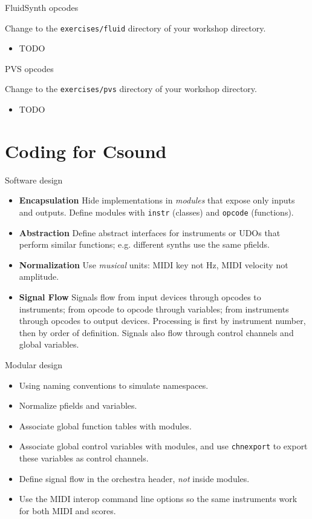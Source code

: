 \documentclass{beamer}
\begin{document}
\begin{frame}{FluidSynth opcodes}
\begin{example}
Change to the \texttt{exercises/fluid} directory of your workshop directory.
\begin{itemize}
\item TODO
\end{itemize}
\end{example}
\end{frame}

\begin{frame}{PVS opcodes}
\begin{example}
Change to the \texttt{exercises/pvs} directory of your workshop directory.
\begin{itemize}
\item TODO
\end{itemize}
\end{example}
\end{frame}


\section{Coding for Csound}
\begin{frame}{Software design}
\begin{itemize}
\item \textbf{Encapsulation} Hide implementations in \textit{modules} that
expose only inputs and outputs. Define modules with \texttt{instr} (classes) and
\texttt{opcode} (functions).
\item \textbf{Abstraction} Define abstract interfaces for instruments or
UDOs that perform similar functions; e.g. different synths use the same
pfields.
\item \textbf{Normalization} Use \textit{musical} units: MIDI key not
Hz, MIDI velocity not amplitude.
\item \textbf{Signal Flow} Signals flow from input devices through
opcodes to instruments; from opcode to opcode through variables; from
instruments through opcodes to output devices. Processing is first by
instrument number, then by order of definition. Signals also flow through
control channels and global variables.
\end{itemize}
\end{frame}

\begin{frame}{Modular design}
\begin{itemize}
\item Using naming conventions to simulate namespaces.
\item Normalize pfields and variables.
\item Associate global function tables with modules.
\item Associate global control variables with modules, and use
\texttt{chnexport} to export these variables as control channels.
\item Define signal flow in the orchestra header, \textit{not} inside modules.
\item Use the MIDI interop command line options so the same instruments work for both MIDI and scores.
\end{itemize}
\end{frame}
\end{document}
